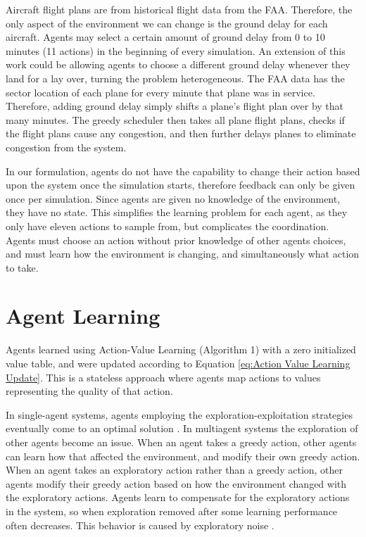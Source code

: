 \documentclass[onehalf,11pt]{beavtex}
\begin{document}
Aircraft flight plans are from historical flight data from the FAA. Therefore, the only aspect of the environment we can change is the ground delay for each aircraft. Agents may select a certain amount of ground delay from 0 to 10 minutes (11 actions) in the beginning of every simulation. An extension of this work could be allowing agents to choose a different ground delay whenever they land for a lay over, turning the problem heterogeneous. The FAA data has the sector location of each plane for every minute that plane was in service. Therefore, adding ground delay simply shifts a plane's flight plan over by that many minutes. The greedy scheduler then takes all plane flight plans, checks if the flight plans cause any congestion, and then further delays planes to eliminate congestion from the system.

In our formulation, agents do not have the capability to change their action based upon the system once the simulation starts, therefore feedback can only be given once per simulation. Since agents are given no knowledge of the environment, they have no state. This simplifies the learning problem for each agent, as they only have eleven actions to sample from, but complicates the coordination. Agents must choose an action without prior knowledge of other agents choices, and must learn how the environment is changing, and simultaneously what action to take.

\section{Agent Learning}
Agents learned using Action-Value Learning (Algorithm 1) with a zero initialized value table, and were updated according to Equation \ref{eq:Action Value Learning Update}. This is a stateless approach where agents map actions to values representing the quality of that action. 

In single-agent systems, agents employing the exploration-exploitation strategies eventually come to an optimal solution \cite{Sutton98reinforcementlearning}. In multiagent systems the exploration of other agents become an issue. When an agent takes a greedy action, other agents can learn how that affected the environment, and modify their own greedy action. When an agent takes an exploratory action rather than a greedy action, other agents modify their greedy action based on how the environment changed with the exploratory actions. Agents learn to compensate for the exploratory actions in the system, so when exploration removed after some learning performance often decreases. This behavior is caused by exploratory noise \cite{holmes-aamas}.
\end{document}
